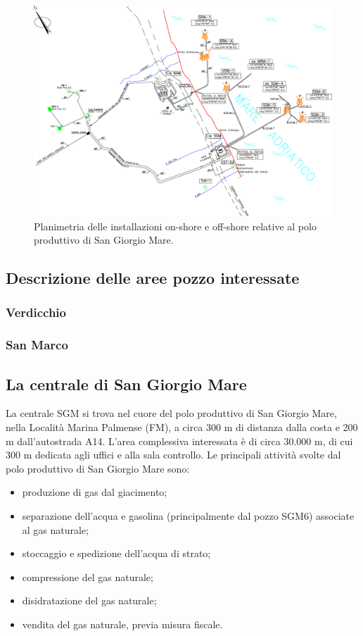 \begin{landscape}
	\begin{figure}[htbp]
    	\centering
    	\includegraphics[width=\textwidth,height=\textheight,keepaspectratio]{fig/test/asset.eps}
    	\caption{Planimetria delle installazioni on-shore e off-shore relative al polo produttivo di San Giorgio Mare.}
    	\label{fig:asset}
	\end{figure}
\end{landscape}

\subsection{Descrizione delle aree pozzo interessate}
\subsubsection{Verdicchio}
\subsubsection{San Marco}

\subsection{La centrale di San Giorgio Mare}
La centrale SGM si trova nel cuore del polo produttivo di San Giorgio Mare, nella Località Marina Palmense (FM), a circa 300 m di distanza dalla costa e 200 m dall'autostrada A14. L'area complessiva interessata è di circa 30.000 m, di cui 300 m dedicata agli uffici e alla sala controllo.
Le principali attività svolte dal polo produttivo di San Giorgio Mare sono:
\begin{itemize}
 	\item produzione di gas dal giacimento;
 	\item separazione dell'acqua e gasolina (principalmente dal pozzo SGM6) associate al gas naturale;
 	\item stoccaggio e spedizione dell'acqua di strato;
 	\item compressione del gas naturale;
 	\item disidratazione del gas naturale;
 	\item vendita del gas naturale, previa misura fiscale.
\end{itemize}

